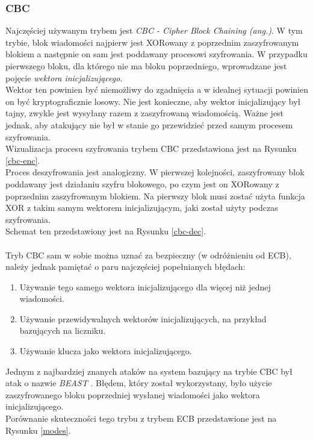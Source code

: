 \subsubsection{CBC}
Najczęściej używanym trybem jest \textit{CBC - Cipher Block Chaining (ang.)}. 
W tym trybie, blok wiadomości najpierw jest XORowany z poprzednim zaszyfrowanym blokiem a następnie
on sam jest poddawany procesowi szyfrowania. W przypadku pierwszego bloku, dla którego nie ma bloku poprzedniego, 
wprowadzane jest pojęcie \textit{wektora inicjalizującego}. \\ 
Wektor ten powinien być niemożliwy do zgadnięcia a w idealnej sytuacji powinien on być kryptograficznie losowy. Nie jest konieczne, aby wektor inicjalizujący był tajny, zwykle jest wysyłany razem z zaszyfrowaną wiadomością. Ważne jest jednak, aby atakujący nie był w stanie go przewidzieć przed samym procesem szyfrowania. \\ 
Wizualizacja procesu szyfrowania trybem CBC przedstawiona jest na Rysunku \ref{cbc-enc}. \\
Proces deszyfrowania jest analogiczny. W pierwszej kolejności, zaszyfrowany blok poddawany jest działaniu szyfru 
blokowego, po czym jest on XORowany z poprzednim zaszyfrowanym blokiem. Na pierwszy blok musi zostać użyta funkcja XOR
z takim samym wektorem inicjalizującym, jaki został użyty podczas szyfrowania. \\ 
Schemat ten przedstawiony jest na Rysunku \ref{cbc-dec}. \\\\
Tryb CBC sam w sobie można uznać za bezpieczny (w odróżnieniu od ECB), 
należy jednak pamiętać o paru najczęściej popełnianych błędach:
\begin{enumerate}
	\item Używanie tego samego wektora inicjalizującego dla więcej niż jednej wiadomości.
	\item Używanie przewidywalnych wektorów inicjalizujących, na przykład bazujących na liczniku.
	\item Używanie klucza jako wektora inicjalizującego. 
\end{enumerate}
Jednym z najbardziej znanych ataków na system bazujący na trybie CBC był atak o nazwie \textit{BEAST} \cite{beast}. 
Błędem, który został wykorzystany, było użycie zaszyfrowanego bloku poprzedniej wysłanej wiadomości jako wektora inicjalizującego. \\
Porównanie skuteczności tego trybu z trybem ECB przedstawione jest na Rysunku \ref{modes}.
